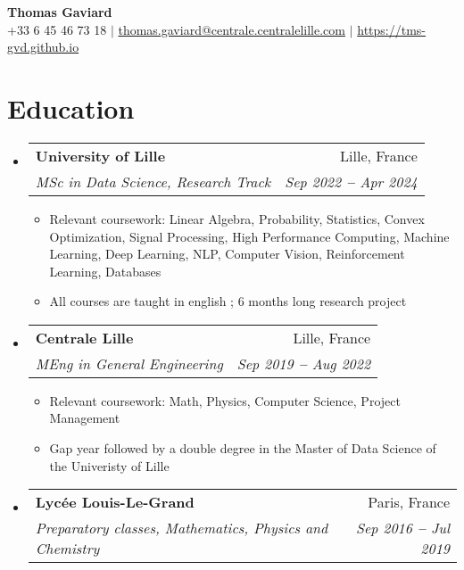 \documentclass[letterpaper,11pt]{article}
\makeatletter
\newcommand{\resumeItem}[1]{
  \item\small{
    {#1 \vspace{-2pt}}
  }
}
\newcommand{\resumeSubheading}[4]{
  \vspace{-2pt}\item
    \begin{tabular*}{0.97\textwidth}[t]{l@{\extracolsep{\fill}}r}
      \textbf{#1} & #2 \\
      \textit{\small#3} & \textit{\small #4} \\
    \end{tabular*}\vspace{-7pt}
}
\newcommand{\resumeSubHeadingListStart}{\begin{itemize}[leftmargin=0.15in, label={}]}
\newcommand{\resumeSubHeadingListEnd}{\end{itemize}}
\newcommand{\resumeItemListStart}{\begin{itemize}}
\newcommand{\resumeItemListEnd}{\end{itemize}\vspace{-5pt}}
\makeatother
\begin{document}

\begin{center}
    \textbf{\huge Thomas Gaviard} \\ \vspace{3pt}
    \small
    \faMobile \hspace{.5pt} +33 6 45 46 73 18
    $|$
    \faAt \hspace{.5pt} \href{mailto:thomas.gaviard@centrale.centralelille.com}{thomas.gaviard@centrale.centralelille.com}
    $|$
    \faGlobe \hspace{.5pt} \href{https://tms-gvd.github.io}{https://tms-gvd.github.io}
\end{center}




\section{Education}
  \vspace{3pt}
  \resumeSubHeadingListStart
    
    \resumeSubheading
      {University of Lille
      }{Lille, France}
      {MSc in Data Science, Research Track}{Sep 2022 \textbf{--} Apr 2024}
      \resumeItemListStart
        \resumeItem{Relevant coursework: Linear Algebra, Probability, Statistics, Convex Optimization, Signal Processing, High Performance Computing, Machine Learning, Deep Learning, NLP, Computer Vision, Reinforcement Learning, Databases}
        \resumeItem{All courses are taught in english ; 6 months long research project}
      \resumeItemListEnd
    
    \resumeSubheading
      {Centrale Lille
      }{Lille, France}
      {MEng in General Engineering}{Sep 2019 \textbf{--} Aug 2022}
      \resumeItemListStart
        \resumeItem{Relevant coursework: Math, Physics, Computer Science, Project Management}
        \resumeItem{Gap year followed by a double degree in the Master of Data Science of the Univeristy of Lille}
      \resumeItemListEnd
    
    \resumeSubheading
      {Lycée Louis-Le-Grand
      }{Paris, France}
      {Preparatory classes, Mathematics, Physics and Chemistry}{Sep 2016 \textbf{--} Jul 2019}
  \resumeSubHeadingListEnd
\end{document}
